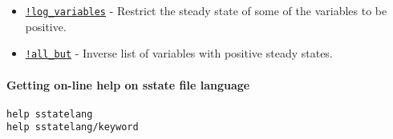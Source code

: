 \begin{itemize}
\itemsep1pt\parskip0pt
\item
  \href{sstatelang/logvariables}{\texttt{!log\_variables}} - Restrict
  the steady state of some of the variables to be positive.
\item
  \href{sstatelang/allbut}{\texttt{!all\_but}} - Inverse list of
  variables with positive steady states.
\end{itemize}

\paragraph{Getting on-line help on sstate file
language}\label{getting-on-line-help-on-sstate-file-language}

\begin{verbatim}
help sstatelang
help sstatelang/keyword
\end{verbatim}



